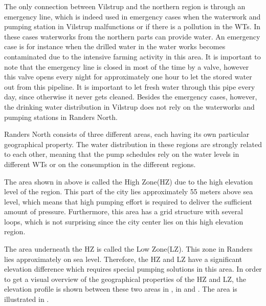 
The only connection between Vilstrup and the northern region is through an emergency line, which is indeed used in emergency cases when the waterwork and pumping station in Vilstrup malfunctions or if there is a pollution in the WTs. In these cases waterworks from the northern parts can provide water. An emergency case is for instance when the drilled water in the water works becomes contaminated due to the intensive farming activity in this area. It is important to note that the emergency line is closed in most of the time by a valve, however this valve opens every night for approximately one hour to let the stored water out from this pipeline. It is important to let fresh water through this pipe every day, since otherwise it never gets cleaned. Besides the emergency cases, however, the drinking water distribution in Vilstrup does not rely on the waterworks and pumping stations in Randers North.  

Randers North consists of three different areas, each having its own particular geographical property. The water distribution in these regions are strongly related to each other, meaning that the pump schedules rely on the water levels in different WTs or on the consumption in the different regions. 

The area shown in  above is called the High Zone(HZ) due to the high elevation level of the region. This part of the city lies approximately 55 meters above sea level, which means that high pumping effort is required to deliver the sufficient amount of pressure. Furthermore, this area has a grid structure with several loops, which is not surprising since the city center lies on this high elevation region.  

The area underneath the HZ is called the Low Zone(LZ). This zone in Randers lies approximately on sea level. Therefore, the HZ and LZ have a significant elevation difference which requires special pumping solutions in this area. In order to get a visual overview of the geographical properties of the HZ and LZ, the elevation profile is shown between these two areas in , in  and . The area is illustrated in .


